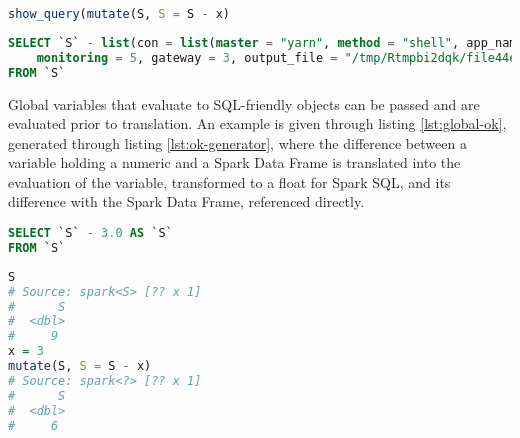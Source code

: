 \documentclass[10pt,a4paper]{article}
\begin{document}
\begin{lstlisting}[language=R, caption={Attempt in R to form new column from the difference between two separate Spark data frames \texttt{S} and \texttt{x}}, label=lst:bad]
show_query(mutate(S, S = S - x)
\end{lstlisting}

\begin{lstlisting}[language=SQL, caption={Spark SQL query generated from attempt to form the difference from two seperate data frames}, label=lst:computer-no]
SELECT `S` - list(con = list(master = "yarn", method = "shell", app_name = "sparklyr", config = list(spark.env.SPARK_LOCAL_IP.local = "127.0.0.1", sparklyr.connect.csv.embedded = "\^1.*", spark.sql.legacy.utcTimestampFunc.enabled = TRUE, sparklyr.connect.cores.local = 4, spark.sql.shuffle.partitions.local = 4), state = <environment>, extensions = list(jars = character(0), packages = character(0), initializers = list(), catalog_jars = character(0)), spark_home = "/shared/spark-3.0.0-preview2-bin-hadoop3.2", backend = 4,
    monitoring = 5, gateway = 3, output_file = "/tmp/Rtmpbi2dqk/file44ec187daaf4_spark.log", sessionId = 58600, home_version = "3.0.0")) AS `S1`, `S` - list(x = "x", vars = "initial") AS `S2`
FROM `S`
\end{lstlisting}

Global variables that evaluate to SQL-friendly objects can be passed and are
evaluated prior to translation.
An example is given through listing \ref{lst:global-ok}, generated through
listing \ref{lst:ok-generator}, where the difference between a variable holding
a numeric and a Spark Data Frame is translated into the evaluation of the
variable, transformed to a float for Spark SQL, and its difference with the
Spark Data Frame, referenced directly.

\begin{lstlisting}[language=SQL, caption={Spark SQL query generated from attempt to form the difference between a data frame and a numeric}, label=lst:global-ok]
SELECT `S` - 3.0 AS `S`
FROM `S`
\end{lstlisting}

\begin{lstlisting}[language=R, caption={Capacity in sparklyr to form new column from the difference between a spark data frame and a numeric}, label=lst:ok-generator]
S
# Source: spark<S> [?? x 1]
#      S
#  <dbl>
#     9
x = 3
mutate(S, S = S - x)
# Source: spark<?> [?? x 1]
#      S
#  <dbl>
#     6
\end{lstlisting}
\end{document}
